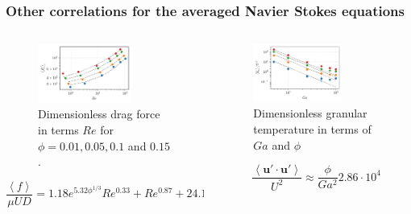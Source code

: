 \documentclass{sintefbeamer}
\newcommand{\avg}[1]{\left<#1\right>}
\begin{document}
\begin{frame}
  \frametitle{Other correlations for the averaged Navier Stokes equations}
\begin{columns}
  \begin{column}{0.5\textwidth}
    \begin{figure}
      \includegraphics*[width=0.7\textwidth]{image/HOMOGENEOUS/fCA/FH_mu_Re.pdf}
      \caption{Dimensionless drag force in terms $Re$ for $\phi = 0.01, 0.05, 0.1$ and $0.15$.}
    \end{figure}
    \begin{equation*}
      \frac{\avg{f}}{\mu UD} 
      = 1.18 e^{5.32\phi^{1/3}}  Re^{0.33}  + Re^{0.87} +24.12
    \end{equation*}
  \end{column}
  \begin{column}{0.5\textwidth}
    \begin{figure}[h!]
      \centering
      \includegraphics[width=0.7\textwidth]{image/HOMOGENEOUS/fPA/Talpha.pdf}
      \caption{Dimensionless granular temperature in terms of $Ga$ and $\phi$}
  \end{figure}
  \begin{equation}
    \frac{\avg{\textbf{u}'\cdot \textbf{u}'}}{U^2}  \approx \frac{\phi}{Ga^2} 2.86\cdot10^{4} 
    \label{eq:Talpha_scaling}
\end{equation}
  \end{column}
\end{columns}
\end{frame}
\end{document}
